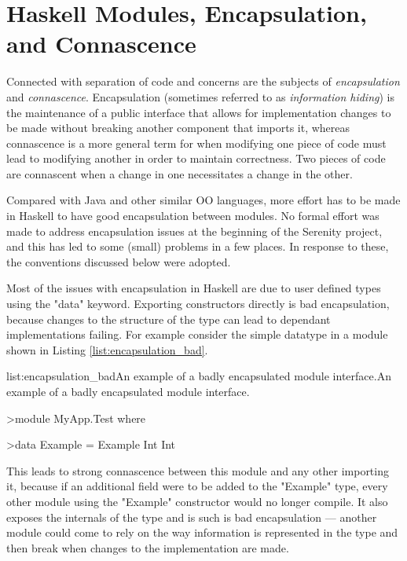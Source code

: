 \section{Haskell Modules, Encapsulation, and Connascence}
\label{sec:encapsulation}

Connected with separation of code and concerns are the subjects of \emph{encapsulation} and \emph{connascence}. Encapsulation (sometimes referred to as \emph{information hiding}) is the maintenance of a public interface that allows for implementation changes to be made without breaking another component that imports it, whereas connascence is a more general term for when modifying one piece of code must lead to modifying another in order to maintain correctness. Two pieces of code are connascent when a change in one necessitates a change in the other.

Compared with Java and other similar OO languages, more effort has to be made in Haskell to have good encapsulation between modules. No formal effort was made to address encapsulation issues at the beginning of the Serenity project, and this has led to some (small) problems in a few places. In response to these, the conventions discussed below were adopted.

Most of the issues with encapsulation in Haskell are due to user defined types using the "data" keyword. Exporting constructors directly is bad encapsulation, because changes to the structure of the type can lead to dependant implementations failing. For example consider the simple datatype in a module shown in Listing \ref{list:encapsulation_bad}.

\vspace{-0.5em}
\begin{listing}{list:encapsulation_bad}{An example of a badly encapsulated module interface.}{An example of a badly encapsulated module interface.}{}
\end{listing}\vspace{-1.5em}

\begin{haskell}
>module MyApp.Test where

>data Example = Example Int Int

\end{haskell}
\noindent
This leads to strong connascence between this module and any other importing it, because if an additional field were to be added to the "Example" type, every other module using the "Example" constructor would no longer compile. It also exposes the internals of the type and is such is bad encapsulation --- another module could come to rely on the way information is represented in the type and then break when changes to the implementation are made.

